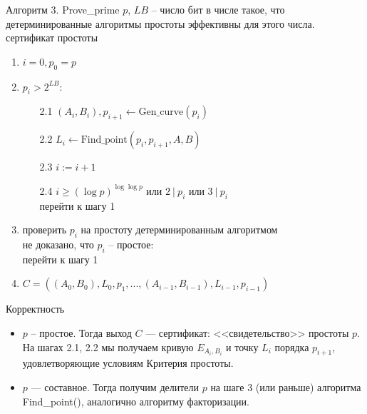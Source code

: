 \documentclass{beamer}
\begin{document}
\begin{frame}{Алгоритм 3. Prove\_prime}
         $p$, $LB$ -- число бит в числе такое, что детерминированные алгоритмы простоты эффективны для этого числа.\\
         сертификат простоты
        
        \begin{enumerate}
            \item $i = 0, p_0 = p$
            \item {} {$p_i > 2^{LB}$}:
            \begin{enumerate}
                \item[2.1] $(A_i, B_i), p_{i+1} \leftarrow \text{Gen\_curve}(p_i)$
                \item[2.2] $L_i \leftarrow \text{Find\_point} (p_i, p_{i+1}, A, B)$
                \item[2.3] $i := i+1$
                \item[2.4]  {$i \geq (\log p)^{\log\log p}$ или $2\ |\ p_i$ или $3\ |\ p_i$}\\
                \quad перейти к шагу 1
            \end{enumerate}
            \item проверить $p_i$ на простоту детерминированным алгоритмом\\
             {не доказано, что $p_i$ -- простое}:\\
            \quad перейти к шагу 1
            \item {} $C = ((A_0, B_0), L_0, p_1, ..., (A_{i-1}, B_{i-1}), L_{i-1}, p_{i-1})$
        \end{enumerate}
\end{frame}

\begin{frame}{Корректность}
\begin{itemize}
    \item $p$ -- простое. Тогда выход $C$ — сертификат:  <<свидетельство>> простоты $p$. На шагах 2.1, 2.2 мы получаем кривую $E_{A_i, B_i}$  и точку $L_i$ порядка $p_{i+1}$, удовлетворяющие условиям Критерия простоты.
    \item $p$ — составное. Тогда получим делители $p$ на шаге 3 (или раньше) алгоритма Find\_point(), аналогично алгоритму факторизации. 
\end{itemize}
\end{frame}
\end{document}
